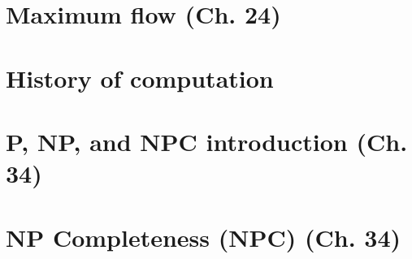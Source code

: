 \documentclass{article}
\begin{document}

\section{Maximum flow (Ch. 24)}



\section{History of computation}



\section{P, NP, and NPC introduction (Ch. 34)}


\section{NP Completeness (NPC) (Ch. 34)} 


\end{document}
